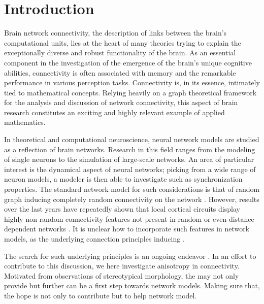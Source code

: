 \chapter{Introduction}\label{ch:Introduction} 

Brain network connectivity, the description of links between the
brain's computational units, lies at the heart of many theories trying
to explain the exceptionally diverse and robust functionality of the
brain. As an essential component in the investigation of the emergence
of the brain's unique cognitive abilities, connectivity is often
associated with memory and the remarkable performance in various
perception tasks. Connectivity is, in its essence, intimately tied to
mathematical concepts. Relying heavily on a graph theoretical
framework for the analysis and discussion of network connectivity,
this aspect of brain research constitutes an exciting and highly
relevant example of applied mathematics.



In theoretical and computational neuroscience, neural network models
are studied as a reflection of brain networks. Research in this field
ranges from the modeling of single neurons to the simulation of
large-scale networks. An area of particular interest is the dynamical
aspect of neural networks; picking from a wide range of neuron models,
a modeler is then able to investigate such as synchronization
properties. The standard network model for such considerations is that
of random graph inducing completely random connectivity on the
network \parencite{Brunel2000}. However, results over the last years
have repeatedly shown that local cortical circuits display highly
non-random connectivity features not present in random or even
distance-dependent networks \parencite{Song2005, Perin2011}. It is
unclear how to incorporate such features in network models, as the
underlying connection principles inducing . 


The search for such underlying principles is an ongoing
endeavor \parencite[cf.]{Klinshov2014}. In an effort to contribute to this
discussion, we here investigate anisotropy in connectivity. Motivated
from observations of stereotypical morphology, the may not only
provide but further can be a first step towards network models. Making
sure that, the hope is not only to contribute but to help network
model.

